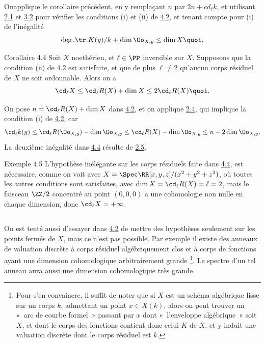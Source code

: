 \documentclass[10pt]{../fichiers-configuration-latex/smfart}
\begin{document}
On\pageoriginale applique le corollaire précédent, en y remplaçant
$n$ par $2n+cd_{\ell}k$, et utilisant \hyperref[X.thm2.1]{2.1} et \hyperref[X.prop3.2]{3.2} 
pour vérifier les
conditions (i) et (ii) de \hyperref[X.cor4.2]{4.2}, et tenant compte pour (i) de
l'inégalité
$$
\deg.\tr.K(y)/k+\dim \Oo_{X,y}\leq \dim X{\quoi}.
$$

\begin{enonce*}{Corollaire 4.4}
Soit $X$ noethérien, et $\ell\in \PP$ inversible
sur $X$. Supposons que la condition {\rm (ii)} de $4.2$ est
satisfaite, et que de plus $\ell\neq 2$  qu'aucun corps résiduel de
$X$ ne soit ordonnable. Alors on a
$$
\cd_{\ell}X\leq \cd_{\ell}R(X)+\dim X\leq 2\cd_{\ell}R(X){\quoi}.
$$
\end{enonce*}

On pose $n=\cd_{\ell}R(X)+\dim X$ dans \hyperref[X.cor4.2]{4.2}, et on applique \hyperref[X.cor2.4]{2.4}, 
qui implique la condition (i) de \hyperref[X.cor4.2]{4.2}, car
\[\cd_{\ell}k(y)\leq \cd_{\ell}R(\Oo_{X,y})-\dim \Oo_{X,y}\leq
\cd_{\ell}R(X)-\dim\Oo_{X,y}\leq n-2\dim \Oo_{X,y}.
\]
La deuxième inégalité dans \hyperref[X.cor4.4]{4.4} résulte de \hyperref[X.cor2.5]{2.5}.

\begin{enonce*}[remark]{Exemple 4.5}
L'hypothèse inélégante sur les corps résiduels faite dans \hyperref[X.cor4.4]{4.4}, est
nécessaire, comme on voit avec $X=\Spec
\RR[x,y,z]/(x^2+y^2+z^2)$, où toutes les autres
conditions sont satisfaites, avec $\dim X=\cd_{\ell}R(X)=\ell=2$, mais
le faisceau $\ZZ/2$ concentré au point $(0,0,0)$ a
une cohomologie non nulle en chaque dimension, donc
$\cd_{\ell}X=+\infty$.
\end{enonce*}

\setcounter{subsection}{5}
\subsection{}
On est tenté aussi d'essayer dans \hyperref[X.cor4.2]{4.2} de mettre des hypothèses
seulement sur les points fermés de $X$, mais ce n'est pas
possible. Par exemple il existe des anneaux de valuation discrète à
corps résiduel algébriquement clos et à corps de fonctions ayant une
dimension cohomologique arbitrairement grande \footnote[1]{Pour s'en
  convaincre, il suffit de noter que si $X$ est un schéma algébrique
  lisse sur un corps $k$, admettant un point $x\in X(k)$, alors on
  peut trouver un « arc de courbe formel » passant par $x$ dont
  « l'enveloppe algébrique » soit $X$, et dont le corps des
  fonctions contient donc celui $K$ de $X$, et y induit une valuation
  discrète dont le corps résiduel est $k$.}. Le spectre d'un tel
anneau aura aussi une dimension cohomologique très grande.
\end{document}
